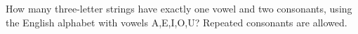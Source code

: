How many three-letter strings have exactly one vowel and two consonants, using the English alphabet with vowels A,E,I,O,U? Repeated consonants are allowed.
